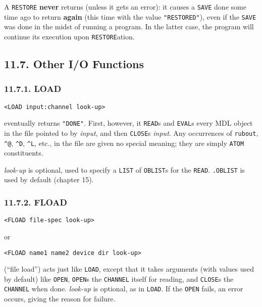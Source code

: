 \documentclass[a4paper,]{article}
\begin{document}
A \texttt{RESTORE} \textbf{never} returns (unless it gets an error): it causes a \texttt{SAVE} done some time ago to return
\textbf{again} (this time with the value \texttt{"RESTORED"}), even if the \texttt{SAVE} was done in the midst of running a
program. In the latter case, the program will continue its execution upon \texttt{RESTORE}ation.

\subsection{11.7. Other I/O Functions}\label{other-io-functions}

\subsubsection{11.7.1. LOAD}\label{load}

\begin{verbatim}
<LOAD input:channel look-up>
\end{verbatim}

 eventually returns \texttt{"DONE"}. First, however, it \texttt{READ}s and \texttt{EVAL}s every
MDL object in the file pointed to by \emph{input}, and then \texttt{CLOSE}s \emph{input}. Any occurrences of
\texttt{rubout}, \texttt{\^{}@}, \texttt{\^{}D}, \texttt{\^{}L}, etc., in the file are given no special meaning; they are
simply \texttt{ATOM} constituents.

\emph{look-up} is optional, used to specify a \texttt{LIST} of \texttt{OBLIST}s for the \texttt{READ}. \texttt{.OBLIST} is
used by default (chapter 15).

\subsubsection{11.7.2. FLOAD}\label{fload}

\begin{verbatim}
<FLOAD file-spec look-up>
\end{verbatim}

or

\begin{verbatim}
<FLOAD name1 name2 device dir look-up>
\end{verbatim}

 (``file load'') acts just like \texttt{LOAD}, except that it takes arguments (with values
used by default) like \texttt{OPEN}, \texttt{OPEN}s the \texttt{CHANNEL} itself for reading, and \texttt{CLOSE}s the
\texttt{CHANNEL} when done. \emph{look-up} is optional, as in \texttt{LOAD}. If the \texttt{OPEN} fails, an error occurs,
giving the reason for failure.
\end{document}
